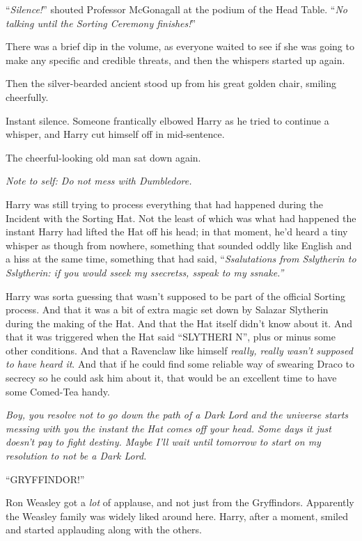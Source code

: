 ``\emph{Silence!}'' shouted Professor McGonagall at the podium of the Head Table. ``\emph{No talking until the Sorting Ceremony finishes!}''

There was a brief dip in the volume, as everyone waited to see if she was going to make any specific and credible threats, and then the whispers started up again.

Then the silver-bearded ancient stood up from his great golden chair, smiling cheerfully.

Instant silence. Someone frantically elbowed Harry as he tried to continue a whisper, and Harry cut himself off in mid-sentence.

The cheerful-looking old man sat down again.

\emph{Note to self: Do not mess with Dumbledore.}

Harry was still trying to process everything that had happened during the Incident with the Sorting Hat. Not the least of which was what had happened the instant Harry had lifted the Hat off his head; in that moment, he'd heard a tiny whisper as though from nowhere, something that sounded oddly like English and a hiss at the same time, something that had said, ``\emph{Ssalutations from Sslytherin to Sslytherin: if you would sseek my ssecretss, sspeak to my ssnake.''}

Harry was sorta guessing that wasn't supposed to be part of the official Sorting process. And that it was a bit of extra magic set down by Salazar Slytherin during the making of the Hat. And that the Hat itself didn't know about it. And that it was triggered when the Hat said ``SLYTHERI N'', plus or minus some other conditions. And that a Ravenclaw like himself \emph{really, really wasn't supposed to have heard it}. And that if he could find some reliable way of swearing Draco to secrecy so he could ask him about it, that would be an excellent time to have some Comed-Tea handy.

\emph{Boy, you resolve not to go down the path of a Dark Lord and the universe starts messing with you the instant the Hat comes off your head. Some days it just doesn't pay to fight destiny. Maybe I'll wait until tomorrow to start on my resolution to not be a Dark Lord.}

``GRYFFINDOR!''

Ron Weasley got a \emph{lot} of applause, and not just from the Gryffindors. Apparently the Weasley family was widely liked around here. Harry, after a moment, smiled and started applauding along with the others.

